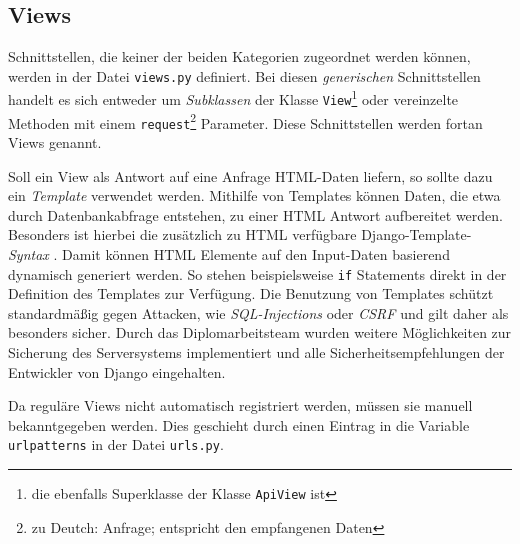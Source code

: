 \hypertarget{views}{%
\subsection{Views}\label{views}}

Schnittstellen, die keiner der beiden \oa{} Kategorien zugeordnet werden
können, werden in der Datei \texttt{views.py} definiert. Bei diesen
\emph{generischen}
Schnittstellen handelt es sich entweder um
\emph{Subklassen}
der Klasse \texttt{View}\footnote{die ebenfalls Superklasse der Klasse
  \texttt{ApiView} ist} \cite{django-doku-class-based-views} oder
vereinzelte Methoden mit einem \texttt{request}\footnote{zu Deutch:
  Anfrage; entspricht den empfangenen Daten} Parameter.
\cite{django-doku-views} Diese Schnittstellen werden fortan Views
genannt.

Soll ein View als Antwort auf eine Anfrage HTML-Daten liefern, so sollte
dazu ein \emph{Template}
verwendet werden. Mithilfe von Templates können Daten, die etwa durch
Datenbankabfrage entstehen, zu einer HTML Antwort aufbereitet werden.
Besonders ist hierbei die zusätzlich zu HTML verfügbare
Django-Template-\emph{Syntax}
\cite{django-doku-template}. Damit können HTML Elemente auf den
Input-Daten basierend dynamisch generiert werden. So stehen
beispielsweise \texttt{if} Statements direkt in der Definition des
Templates zur Verfügung. Die Benutzung von Templates schützt
standardmäßig gegen Attacken, wie
\emph{SQL-Injections}
oder \emph{CSRF}
\cite{csrf}
und gilt daher als besonders sicher. Durch das Diplomarbeitsteam wurden
weitere Möglichkeiten zur Sicherung des Serversystems
\cite{django-doku-security} implementiert und alle
Sicherheitsempfehlungen der Entwickler von Django
\cite{django-doku-security} eingehalten.

Da reguläre Views nicht automatisch registriert werden, müssen sie
manuell bekanntgegeben werden. Dies geschieht durch einen Eintrag in die
Variable \texttt{urlpatterns} in der Datei \texttt{urls.py}.
\cite{django-doku-urls}

